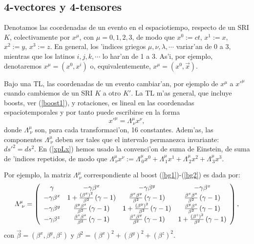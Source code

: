 \subsection{4-vectores y 4-tensores}

Denotamos las coordenadas de un evento en el espaciotiempo,
respecto de un SRI $K$, colectivamente por $x^\mu$, con $\mu=0,1,2,3$, de modo que $x^0:=ct$, $x^1:=x$, $x^2:=y$, $x^3:=z$. En general, los 'indices griegos $\mu,\nu,\lambda,\cdots$ variar'an de 0 a 3, mientras que los latinos
$i,j,k,\cdots$ lo har'an de 1 a 3. As'i, por ejemplo, denotaremos
$x^\mu=(x^0,x^i)$ o, equivalentemente, $x^\mu=(x^0,\vec{x})$.

Bajo una TL, las coordenadas de un evento cambiar'an, por ejemplo de $x^\mu$ a
$x'^\mu$ cuando cambiemos de un SRI $K$ a otro $K'$. La TL m'as general, que
incluye boosts, ver (\ref{boost1}), y rotaciones, es lineal en las coordenadas
espaciotemporales y por tanto puede escribirse en la forma
\begin{equation}\label{xpLx}
x'^\mu=\Lambda^\mu_{\ \nu}x^\nu ,
\end{equation}
donde $\Lambda^\mu_{\ \nu}$ son, para cada transformaci'on, 16 constantes. Adem'as, las componentes $\Lambda^\mu_{\ \nu}$ deben ser tales que el intervalo permanezca invariante: $ds'^2=ds^2$.
En (\ref{xpLx}) hemos usado la convenci'on de suma de Einstein, de suma de
'indices repetidos, de modo que $\Lambda^\mu_{\
\nu}x^\nu:=\Lambda^\mu_{\ 0}x^0+ \Lambda^\mu_{\ 1}x^1+ \Lambda^\mu_{\ 2}x^2+\Lambda^\mu_{\ 3}x^3$.

Por ejemplo, la matriz $\Lambda^\mu_{\ \nu}$ correspondiente al boost (\ref{bg1})-(\ref{bg2}) es dada por:
\begin{equation}
\Lambda^\mu_{\ \nu}=\left(
\begin{array}
[c]{cccc}
\gamma & -\gamma\beta^x & -\gamma\beta^y & -\gamma\beta^z\\
-\gamma\beta^x & 1+\frac{(\beta^x)^2}{\beta^2}\left(\gamma-1\right)  &
\frac{\beta^x\beta^y}{\beta^2}\left(\gamma-1\right)  & \frac{\beta^x\beta^z}{\beta^2}\left(\gamma-1\right) \\
-\gamma\beta^y & \frac{\beta^y\beta^x}{\beta^2}\left(\gamma-1\right)
& 1+\frac{(\beta^y)^2}{\beta^2}\left(\gamma-1\right)  & \frac{\beta
^y\beta^z}{\beta^2}\left(  \gamma-1\right) \\
-\gamma\beta^z & \frac{\beta^z\beta^x}{\beta^2}\left(\gamma-1\right)
& \frac{\beta^z\beta^y}{\beta^2}\left(\gamma-1\right)  & 1+\frac{(\beta^z)^2}{\beta^2}\left(\gamma-1\right)
\end{array}
\right), \label{boostgen}
\end{equation}
con $\vec\beta=(\beta^x,\beta^y,\beta^z)$ y $\beta^2=(\beta^x)^2+(\beta^y)^2+(\beta^z)^2$.

